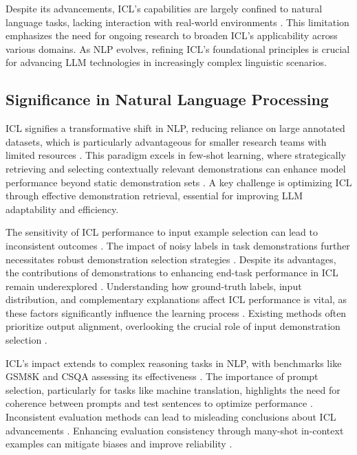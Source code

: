 Despite its advancements, ICL's capabilities are largely confined to natural language tasks, lacking interaction with real-world environments \cite{wang2024benchmarkinggeneralpurposeincontextlearning}. This limitation emphasizes the need for ongoing research to broaden ICL's applicability across various domains. As NLP evolves, refining ICL's foundational principles is crucial for advancing LLM technologies in increasingly complex linguistic scenarios.

\subsection{Significance in Natural Language Processing} \label{subsec:Significance in Natural Language Processing}

ICL signifies a transformative shift in NLP, reducing reliance on large annotated datasets, which is particularly advantageous for smaller research teams with limited resources \cite{rezaei2022superpromptingutilizingmodelindependentcontextual}. This paradigm excels in few-shot learning, where strategically retrieving and selecting contextually relevant demonstrations can enhance model performance beyond static demonstration sets \cite{luo2024incontextlearningretrieveddemonstrations}. A key challenge is optimizing ICL through effective demonstration retrieval, essential for improving LLM adaptability and efficiency.

The sensitivity of ICL performance to input example selection can lead to inconsistent outcomes \cite{nguyen2023incontextexampleselectioninfluences}. The impact of noisy labels in task demonstrations further necessitates robust demonstration selection strategies \cite{kang2024incontextlearningnoisylabels}. Despite its advantages, the contributions of demonstrations to enhancing end-task performance in ICL remain underexplored \cite{long2024doesincontextlearningreally}. Understanding how ground-truth labels, input distribution, and complementary explanations affect ICL performance is vital, as these factors significantly influence the learning process \cite{liu2024understandingincontextlearningcontrastive}. Existing methods often prioritize output alignment, overlooking the crucial role of input demonstration selection \cite{qin2024improvingincontextlearningbidirectional}.

ICL's impact extends to complex reasoning tasks in NLP, with benchmarks like GSM8K and CSQA assessing its effectiveness \cite{chen2023demonstrationsneedincontextlearning}. The importance of prompt selection, particularly for tasks like machine translation, highlights the need for coherence between prompts and test sentences to optimize performance \cite{sia2023incontextlearningmaintainingcoherency}. Inconsistent evaluation methods can lead to misleading conclusions about ICL advancements \cite{voronov2024mindformatconsistentevaluation}. Enhancing evaluation consistency through many-shot in-context examples can mitigate biases and improve reliability \cite{song2024can}.

